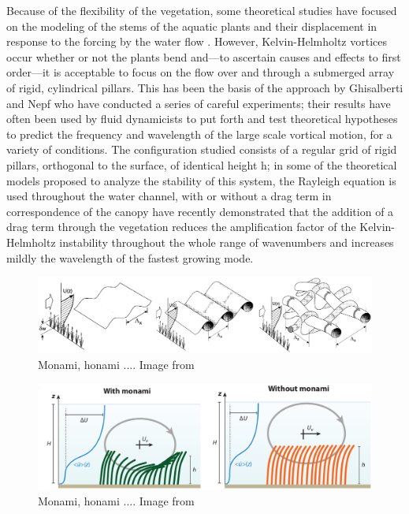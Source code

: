 Because of the flexibility of the vegetation, some theoretical studies have focused on the
modeling of the stems of the aquatic plants and their displacement in response to the forcing by the
water flow \citet{py2004mixing} \citet{patil2010characteristics} \citet{gosselin2009destabilising} \citet{py2006frequency}.
However, Kelvin-Helmholtz vortices occur whether or not the plants bend and—to ascertain causes and effects to first order—it is acceptable to focus on the flow over and through a submerged array of rigid, cylindrical pillars. 
This has been the basis of the approach by Ghisalberti and Nepf \citet{ghisalberti2002mixing} \citet{ghisalberti2004limited} \citet{ghisalberti2005mass} who have conducted a series of careful experiments; their results have often been
used by fluid dynamicists to put forth and test theoretical hypotheses to predict the frequency and
wavelength of the large scale vortical motion, for a variety of conditions.
The configuration studied consists of a regular grid of rigid pillars, orthogonal to the surface, of identical height h; in some
of the theoretical models proposed to analyze the stability of this system, the Rayleigh equation is
used throughout the water channel, with or without a drag term in correspondence of the canopy \citet{raupach1996coherent} \citet{py2004mixing} \citet{singh2016linear} \citet{zampogna2016instability} have recently demonstrated that the addition of a drag term through the vegetation reduces the amplification factor of the Kelvin-Helmholtz instability throughout the whole
range of wavenumbers and increases mildly the wavelength of the fastest growing mode.

\begin{figure}[h]
	\centering
	\includegraphics[width=1\linewidth]{chapter_1/finn}
	\caption{Monami, honami .... Image from \citet{finnigan2000turbulence}}
	\label{fig:monai_evol}
\end{figure}


\begin{figure}[h]
	\centering
	\includegraphics[width=1\linewidth]{chapter_1/monami}
	\caption{Monami, honami .... Image from \citet{nepf2012flow}}
	\label{fig:monami}
\end{figure}



